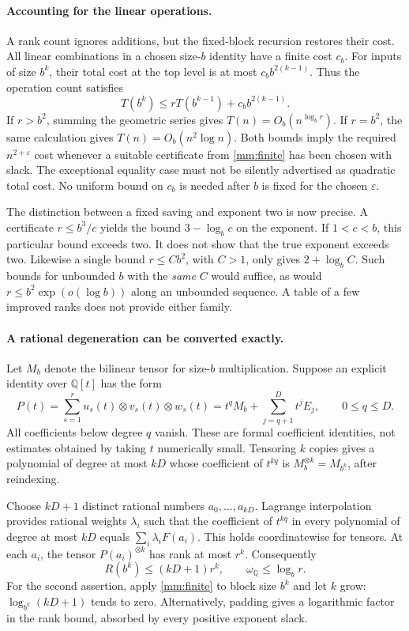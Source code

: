 \documentclass[11pt]{article}
\begin{document}
\paragraph{Accounting for the linear operations.}
A rank count ignores additions, but the fixed-block recursion restores
their cost. All linear combinations in a chosen size-$b$ identity have
a finite cost $c_b$. For inputs of size $b^k$, their total cost at the
top level is at most $c_b b^{2(k-1)}$. Thus the operation count satisfies
\[
 T(b^k)\le rT(b^{k-1})+c_b b^{2(k-1)}.
\]
If $r>b^2$, summing the geometric series gives $T(n)=O_b(n^{\log_b r})$.
If $r=b^2$, the same calculation gives $T(n)=O_b(n^2\log n)$.
Both bounds imply the required $n^{2+\varepsilon}$ cost whenever a
suitable certificate from \eqref{mm:finite} has been chosen with slack.
The exceptional equality case must not be silently advertised as
quadratic total cost. No uniform bound on $c_b$ is needed after $b$ is
fixed for the chosen $\varepsilon$.

The distinction between a fixed saving and exponent two is now precise.
A certificate $r\le b^3/c$ yields the bound
$3-\log_b c$ on the exponent. If $1<c<b$, this particular bound exceeds
two. It does not show that the true exponent exceeds two. Likewise a
single bound $r\le Cb^2$, with $C>1$, only gives
$2+\log_b C$. Such bounds for unbounded $b$ with the \emph{same} $C$
would suffice, as would $r\le b^2\exp(o(\log b))$ along an unbounded
sequence. A table of a few improved ranks does not provide either family.

\paragraph{A rational degeneration can be converted exactly.}
Let $M_b$ denote the bilinear tensor for size-$b$ multiplication.
Suppose an explicit identity over $\mathbb Q[t]$ has the form
\begin{equation}\label{mm:degeneration}
 P(t)=\sum_{s=1}^r u_s(t)\otimes v_s(t)\otimes w_s(t)
     =t^qM_b+\sum_{j=q+1}^{D}t^j E_j,
 \qquad 0\le q\le D.
\end{equation}
All coefficients below degree $q$ vanish. These are formal coefficient
identities, not estimates obtained by taking $t$ numerically small.
Tensoring $k$ copies gives a polynomial of degree at most $kD$ whose
coefficient of $t^{kq}$ is $M_b^{\otimes k}=M_{b^k}$, after reindexing.

Choose $kD+1$ distinct rational numbers $a_0,\ldots,a_{kD}$.
Lagrange interpolation provides rational weights $\lambda_i$ such that
the coefficient of $t^{kq}$ in every polynomial of degree at most $kD$
equals $\sum_i\lambda_i F(a_i)$. This holds coordinatewise for tensors.
At each $a_i$, the tensor $P(a_i)^{\otimes k}$ has rank at most $r^k$.
Consequently
\begin{equation}\label{mm:extract}
 R(b^k)\le(kD+1)r^k,
 \qquad
 \omega_{\mathbb Q}\le\log_b r.
\end{equation}
For the second assertion, apply \eqref{mm:finite} to block size $b^k$
and let $k$ grow: $\log_{b^k}(kD+1)$ tends to zero. Alternatively,
padding gives a logarithmic factor in the rank bound, absorbed by every
positive exponent slack.
\end{document}
